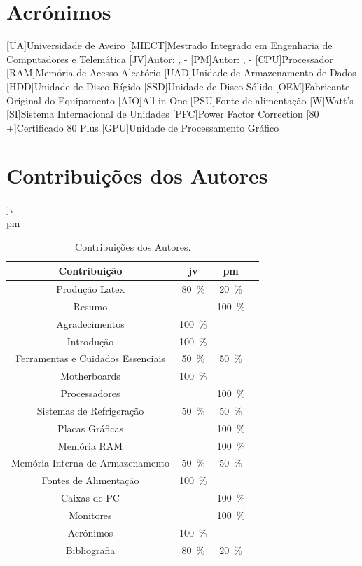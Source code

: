 \chapter*{Acrónimos}
\begin{acronym}
[UA]{Universidade de Aveiro}
[MIECT]{Mestrado Integrado em Engenharia de Computadores e Telemática}
[JV]{Autor: \pautor , \numpautor - }
[PM]{Autor: \sautor , \numsautor - }
[CPU]{Processador}
[RAM]{Memória de Acesso Aleatório}
[UAD]{Unidade de Armazenamento de Dados}
[HDD]{Unidade de Disco Rígido}
[SSD]{Unidade de Disco Sólido}
[OEM]{Fabricante Original do Equipamento}
[AIO]{All-in-One}
[PSU]{Fonte de alimentação}
[W]{Watt's}
[SI]{Sistema Internacional de Unidades}
[PFC]{Power Factor Correction}
[80 +]{Certificado 80 Plus}
[GPU]{Unidade de Processamento Gráfico}
\end{acronym}


\chapter*{Contribuições dos Autores}
\ac{jv} \\
\ac{pm} \\
\begin{table}[H]
    \centering
    \caption{Contribuições dos Autores.}
    \begin{tabular}{|c|c|c|c|}\hline
        Contribuição & \ac{jv} & \ac{pm}  \\ 
        \hline
	    Produção Latex & 80~\% & 20~\%    \\
	    Resumo &  & 100~\%  \\
	    Agradecimentos & 100~\% &   \\
        Introdução & 100~\% &    \\
       	Ferramentas e Cuidados Essenciais  & 50~\% &  50~\%    \\
       	Motherboards & 100~\% &  \\
       	Processadores &  & 100~\% \\
        Sistemas de Refrigeração & 50~\%  & 50~\% \\
		Placas Gráficas	&  &  100~\% \\	
		Memória RAM & & 100~\% \\ 
        Memória Interna de Armazenamento & 50~\% & 50~\% \\
        Fontes de Alimentação & 100~\% & \\
        Caixas de PC & & 100~\% \\
        Monitores & & 100~\% \\
        Acrónimos & 100~\% &  \\ 
        Bibliografia & 80~\% & 20~\%   \\
    \hline
    \end{tabular}
    \label{tab.contribuições}
\end{table}	

